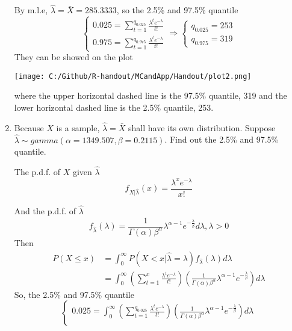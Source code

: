 \documentclass[12pt]{article}
\begin{document}
\begin{enumerate}
	By m.l.e, $\hat{\lambda} = \bar{X} = 285.3333$, so the 2.5\% and 97.5\% quantile
	\begin{equation*}
	\begin{cases}
	0.025 = \sum_{t = 1}^{q_{0.025}}\frac{\lambda^{t}e^{-\lambda}}{t!} \\
	0.975 = \sum_{t = 1}^{q_{0.975}}\frac{\lambda^{t}e^{-\lambda}}{t!} 
	\end{cases} \Rightarrow \begin{cases}
	q_{0.025} = 253 \\
	q_{0.975} = 319
	\end{cases}
	\end{equation*}
	They can be showed on the plot
	\begin{center}
		\texttt{[image: C:/Github/R-handout/MCandApp/Handout/plot2.png]}
	\end{center}
	where the upper horizontal dashed line is the 97.5\% quantile, 319 and the lower horizontal dashed line is the 2.5\% quantile, 253.
	\item Because $X$ is a sample, $\hat{\lambda} = \bar{X}$ shall have its own distribution. Suppose $\hat{\lambda} \sim gamma(\alpha= 1349.507, \beta = 0.2115)$. Find out the 2.5\% and 97.5\% quantile.
	\par The p.d.f. of $X$ given $\hat{\lambda}$
	\begin{equation*}
	f_{X|\hat{\lambda}}(x) = \frac{\lambda^{x}e^{-\lambda}}{x!}
	\end{equation*}
	\par And the p.d.f. of $\hat{\lambda}$
	\begin{equation*}
	f_{\hat{\lambda}}(\lambda) = \frac{1}{\Gamma(\alpha)\beta^{\alpha}}\lambda^{\alpha - 1}e^{-\frac{\lambda}{\beta}}d\lambda, \lambda > 0
	\end{equation*}
	Then
	\begin{equation*}
	\begin{split}
	P(X \le x) &= \int_{0}^{\infty}P(X < x | \hat{\lambda} = \lambda)f_{\hat{\lambda}}(\lambda) d \lambda \\
	& = \int_{0}^{\infty}(\sum_{t = 1}^{x}\frac{\lambda^{t}e^{-\lambda}}{t!})(\frac{1}{\Gamma(\alpha)\beta^{\alpha}}\lambda^{\alpha - 1}e^{-\frac{\lambda}{\beta}}) d \lambda
	\end{split}
	\end{equation*}
	So, the 2.5\% and 97.5\% quantile
	\begin{equation*}
	\begin{cases}
	0.025 = \int_{0}^{\infty}(\sum_{t = 1}^{q_{0.025}}\frac{\lambda^{t}e^{-\lambda}}{t!})(\frac{1}{\Gamma(\alpha)\beta^{\alpha}}\lambda^{\alpha - 1}e^{-\frac{\lambda}{\beta}}) d \lambda \\

\end{cases}
\end{equation*}
\end{enumerate}
\end{document}
